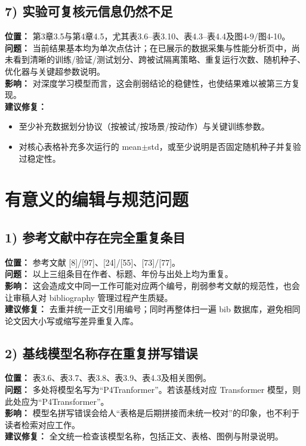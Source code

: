 \documentclass[12pt]{ctexart}
\begin{document}
\subsection*{7) 实验可复核元信息仍然不足}
\textbf{位置：} 第3章3.5与第4章4.5，尤其表3.6--表3.10、表4.3--表4.4及图4-9/图4-10。\\
\textbf{问题：} 当前结果基本均为单次点估计；在已展示的数据采集与性能分析页中，尚未看到清晰的训练/验证/测试划分、跨被试隔离策略、重复运行次数、随机种子、优化器与关键超参数说明。\\
\textbf{影响：} 对深度学习模型而言，这会削弱结论的稳健性，也使结果难以被第三方复现。\\
\textbf{建议修复：}
\begin{itemize}
  \item 至少补充数据划分协议（按被试/按场景/按动作）与关键训练参数。
  \item 对核心表格补充多次运行的 mean\(\pm\)std，或至少说明是否固定随机种子并复验过稳定性。
\end{itemize}

\section*{有意义的编辑与规范问题}

\subsection*{1) 参考文献中存在完全重复条目}
\textbf{位置：} 参考文献 [8]/[97]、[24]/[55]、[73]/[77]。\\
\textbf{问题：} 以上三组条目在作者、标题、年份与出处上均为重复。\\
\textbf{影响：} 这会造成文中同一工作可能对应两个编号，削弱参考文献的规范性，也会让审稿人对 bibliography 管理过程产生质疑。\\
\textbf{建议修复：} 去重并统一正文引用编号；同时再整体扫一遍 bib 数据库，避免相同论文因大小写或缩写差异重复入库。

\subsection*{2) 基线模型名称存在重复拼写错误}
\textbf{位置：} 表3.6、表3.7、表3.8、表3.9、表4.3及相关图例。\\
\textbf{问题：} 多处将模型名写为“P4Tranformer”。若该基线对应 Transformer 模型，则此处应为“P4Transformer”。\\
\textbf{影响：} 模型名拼写错误会给人“表格是后期拼接而未统一校对”的印象，也不利于读者检索对应工作。\\
\textbf{建议修复：} 全文统一检查该模型名称，包括正文、表格、图例与附录说明。
\end{document}

